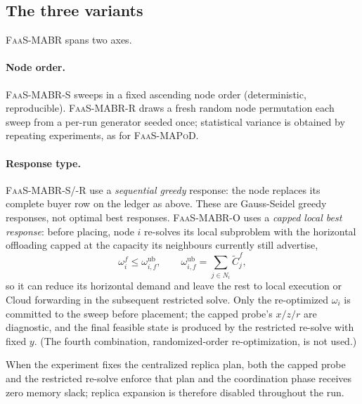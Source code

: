 \subsection{The three variants}
\label{sec:mabr-variants}

\textsc{FaaS-MABR} spans two axes.

\paragraph{Node order.} \textsc{FaaS-MABR-S} sweeps in a fixed ascending node
order (deterministic, reproducible). \textsc{FaaS-MABR-R} draws a fresh random
node permutation each sweep from a per-run generator seeded once; statistical
variance is obtained by repeating experiments, as for \textsc{FaaS-MAPoD}.

\paragraph{Response type.} \textsc{FaaS-MABR-S}/\textsc{-R} use a \emph{sequential
greedy} response: the node replaces its complete buyer row on the ledger as above.
These are Gauss-Seidel greedy responses, not optimal best responses.
\textsc{FaaS-MABR-O} uses a \emph{capped local best response}: before placing,
node $i$ re-solves its local subproblem with the horizontal offloading capped at
the capacity its neighbours currently still advertise,
\begin{equation}
  \omega_i^f \le \omega^{\mathrm{ub}}_{i,f}, \qquad
  \omega^{\mathrm{ub}}_{i,f}=\sum_{j\in N_i}\tilde C_j^f ,
  \label{eq:mabr-cap}
\end{equation}
so it can reduce its horizontal demand and leave the rest to local execution or
Cloud forwarding in the subsequent restricted solve. Only the re-optimized
$\omega_i$ is committed to the sweep before placement; the capped probe's
$x/z/r$ are diagnostic, and the final feasible state is produced by the
restricted re-solve with fixed $y$. (The fourth combination, randomized-order
re-optimization, is not used.)

When the experiment fixes the centralized replica plan, both the capped probe
and the restricted re-solve enforce that plan and the coordination phase receives
zero memory slack; replica expansion is therefore disabled throughout the run.

